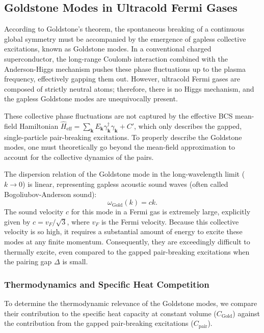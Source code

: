 \subsection{Goldstone Modes in Ultracold Fermi Gases}

According to Goldstone's theorem, the spontaneous breaking of a continuous global symmetry must be accompanied by the emergence of gapless collective excitations, known as Goldstone modes. In a conventional charged superconductor, the long-range Coulomb interaction combined with the Anderson-Higgs mechanism pushes these phase fluctuations up to the plasma frequency, effectively gapping them out. However, ultracold Fermi gases are composed of strictly neutral atoms; therefore, there is no Higgs mechanism, and the gapless Goldstone modes are unequivocally present.

These collective phase fluctuations are not captured by the effective BCS mean-field Hamiltonian \( \hat{H}_{\text{eff}} = \sum_{\mathbf{k}} E_{\mathbf{k}} \gamma_{\mathbf{k}}^\dagger \gamma_{\mathbf{k}} + C' \), which only describes the gapped, single-particle pair-breaking excitations. To properly describe the Goldstone modes, one must theoretically go beyond the mean-field approximation to account for the collective dynamics of the pairs.

The dispersion relation of the Goldstone mode in the long-wavelength limit (\( k \to 0 \)) is linear, representing gapless acoustic sound waves (often called Bogoliubov-Anderson sound):
\[
    \omega_{\text{Gold}}(k) = c k.
\]
The sound velocity \( c \) for this mode in a Fermi gas is extremely large, explicitly given by \( c = v_F / \sqrt{3} \), where \( v_F \) is the Fermi velocity. Because this collective velocity is so high, it requires a substantial amount of energy to excite these modes at any finite momentum. Consequently, they are exceedingly difficult to thermally excite, even compared to the gapped pair-breaking excitations when the pairing gap \( \Delta \) is small.

\subsubsection{Thermodynamics and Specific Heat Competition}

To determine the thermodynamic relevance of the Goldstone modes, we compare their contribution to the specific heat capacity at constant volume (\( C_{\text{Gold}} \)) against the contribution from the gapped pair-breaking excitations (\( C_{\text{pair}} \)).

